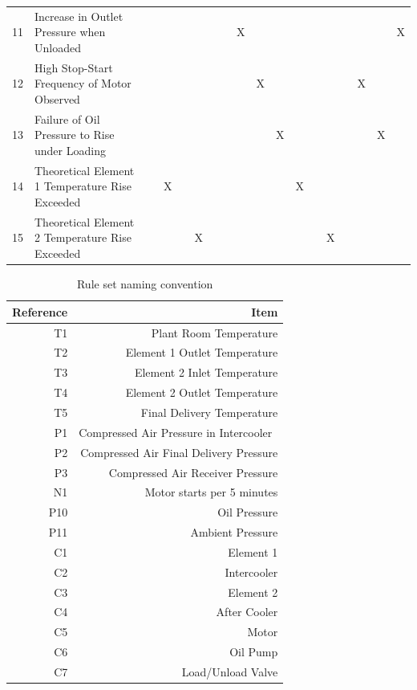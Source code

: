 \begin{table}[htbp]
\begin{tabular}{rlrrrrrrrrrrrrrrrr}
    11    & Increase in Outlet Pressure when Unloaded &       &       &       &       &       &       & X     &       &       &       &       &       &       &       &       & X \\
    12    & High Stop-Start Frequency of Motor Observed &       &       &       &       &       &       &       & X     &       &       &       &       &       & X     &       &  \\
    13    & Failure of Oil Pressure to Rise under Loading &       &       &       &       &       &       &       &       & X     &       &       &       &       &       & X     &  \\
    14    & Theoretical Element 1 Temperature Rise Exceeded &       & X     &       &       &       &       &       &       &       & X     &       &       &       &       &       &  \\
    15    & Theoretical Element 2 Temperature Rise Exceeded &       &       &       & X     &       &       &       &       &       &       &       & X     &       &       &       &  \\
    \bottomrule
    \end{tabular}%
  \label{tab:ruleset}%
\end{table}%

\begin{table}[htbp]
  \centering
  \caption{Rule set naming convention}
    \begin{tabular}{rr}
    \toprule
    Reference & Item \\
    \midrule
    T1    & Plant Room Temperature \\
    T2    & Element 1 Outlet Temperature \\
    T3    & Element 2 Inlet Temperature \\
    T4    & Element 2 Outlet Temperature \\
    T5    & Final Delivery Temperature \\
    P1    & Compressed Air Pressure in Intercooler  \\
    P2    & Compressed Air Final Delivery Pressure \\
    P3    & Compressed Air Receiver Pressure \\
    N1    & Motor starts per 5 minutes \\
    P10   & Oil Pressure \\
    P11   & Ambient Pressure \\
    C1    & Element 1 \\
    C2    & Intercooler \\
    C3    & Element 2 \\
    C4    & After Cooler \\
    C5    & Motor \\
    C6    & Oil Pump \\
    C7    & Load/Unload Valve \\
    \bottomrule
    \end{tabular}%
  \label{tab:namingconvention}%
\end{table}%





